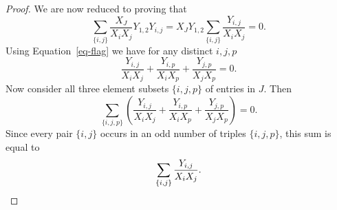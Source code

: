 \begin{proof}
 We are now reduced to proving that 
 \[  \sum_{\{i,j\}} \frac{X_J}{X_{i}X_{j}} Y_{1,2} Y_{i,j} = X_J Y_{1,2} \sum_{\{i,j\}} \frac{Y_{i,j}}{X_{i}X_{j}}  = 0.\]
Using Equation~\eqref{eq-flag} we have for any distinct $i,j, p$
\[ \frac{Y_{i,j}}{X_{i}X_{j}} + \frac{Y_{i,p}}{X_{i}X_{p}} +\frac{Y_{j,p}}{X_{j}X_{p}} = 0.\]
Now consider all three element subsets $\{i,j,p\}$ of entries in $J$. Then 
\[ \sum_{\{i,j,p\}} \left( \frac{Y_{i,j}}{X_{i}X_{j}} + \frac{Y_{i,p}}{X_{i}X_{p}} +\frac{Y_{j,p}}{X_{j}X_{p}} \right) = 0.\]
Since every pair $\{i,j\}$ occurs in an odd number of triples $\{i,j,p\}$, this sum is equal to 
\[ \sum_{\{i,j\}} \frac{Y_{i,j}}{X_{i}X_{j}}. \qedhere\]
\end{proof}
